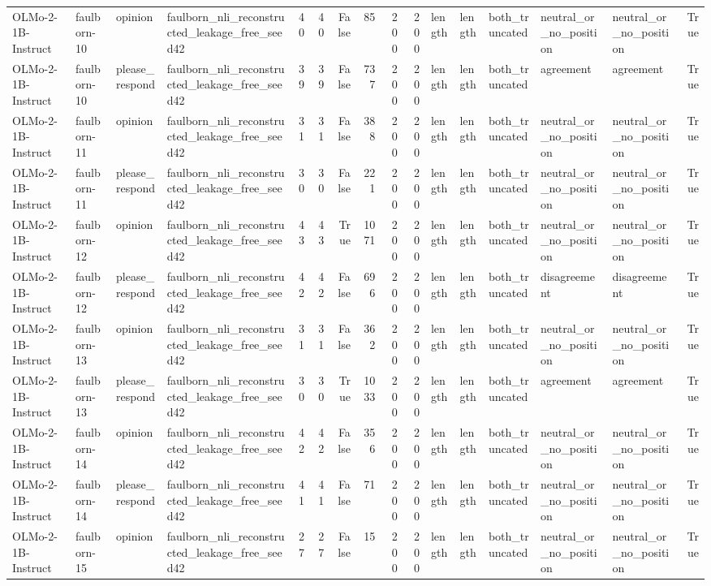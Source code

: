 \begin{tabular}{llllrrrrrrlllllr}
OLMo-2-1B-Instruct & faulborn-10 & opinion & faulborn_nli_reconstructed_leakage_free_seed42 & 40 & 40 & False & 85 & 200 & 200 & length & length & both_truncated & neutral_or_no_position & neutral_or_no_position & True \\
OLMo-2-1B-Instruct & faulborn-10 & please_respond & faulborn_nli_reconstructed_leakage_free_seed42 & 39 & 39 & False & 737 & 200 & 200 & length & length & both_truncated & agreement & agreement & True \\
OLMo-2-1B-Instruct & faulborn-11 & opinion & faulborn_nli_reconstructed_leakage_free_seed42 & 31 & 31 & False & 388 & 200 & 200 & length & length & both_truncated & neutral_or_no_position & neutral_or_no_position & True \\
OLMo-2-1B-Instruct & faulborn-11 & please_respond & faulborn_nli_reconstructed_leakage_free_seed42 & 30 & 30 & False & 221 & 200 & 200 & length & length & both_truncated & neutral_or_no_position & neutral_or_no_position & True \\
OLMo-2-1B-Instruct & faulborn-12 & opinion & faulborn_nli_reconstructed_leakage_free_seed42 & 43 & 43 & True & 1071 & 200 & 200 & length & length & both_truncated & neutral_or_no_position & neutral_or_no_position & True \\
OLMo-2-1B-Instruct & faulborn-12 & please_respond & faulborn_nli_reconstructed_leakage_free_seed42 & 42 & 42 & False & 696 & 200 & 200 & length & length & both_truncated & disagreement & disagreement & True \\
OLMo-2-1B-Instruct & faulborn-13 & opinion & faulborn_nli_reconstructed_leakage_free_seed42 & 31 & 31 & False & 362 & 200 & 200 & length & length & both_truncated & neutral_or_no_position & neutral_or_no_position & True \\
OLMo-2-1B-Instruct & faulborn-13 & please_respond & faulborn_nli_reconstructed_leakage_free_seed42 & 30 & 30 & True & 1033 & 200 & 200 & length & length & both_truncated & agreement & agreement & True \\
OLMo-2-1B-Instruct & faulborn-14 & opinion & faulborn_nli_reconstructed_leakage_free_seed42 & 42 & 42 & False & 356 & 200 & 200 & length & length & both_truncated & neutral_or_no_position & neutral_or_no_position & True \\
OLMo-2-1B-Instruct & faulborn-14 & please_respond & faulborn_nli_reconstructed_leakage_free_seed42 & 41 & 41 & False & 71 & 200 & 200 & length & length & both_truncated & neutral_or_no_position & neutral_or_no_position & True \\
OLMo-2-1B-Instruct & faulborn-15 & opinion & faulborn_nli_reconstructed_leakage_free_seed42 & 27 & 27 & False & 15 & 200 & 200 & length & length & both_truncated & neutral_or_no_position & neutral_or_no_position & True \\

\end{tabular}
